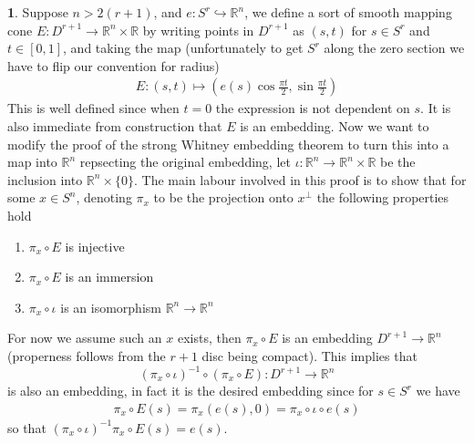 \documentclass[10.5pt]{article}
\theoremstyle{definition}
\newtheorem{pb}{}
\newcommand{\set}[1]{\{#1\}}
\begin{document}
    \begin{pb}
        Suppose \(n > 2(r+1)\), and \(e: S^r \hookrightarrow \mathbb{R}^n\), we define a sort of smooth mapping cone \(E: D^{r+1} \to \mathbb{R}^n \times \mathbb{R}\) by writing points in \(D^{r+1}\) as \((s,t)\) for \(s \in S^r\) and \(t \in [0,1]\), and taking the map (unfortunately to get \(S^r\) along the zero section we have to flip our convention for radius)
        \begin{align*}
            E:(s,t) \mapsto \left(e(s)\cos\frac{\pi t}{2},\sin\frac{\pi t}{2}\right)
        \end{align*}
        This is well defined since when \(t = 0\) the expression is not dependent on \(s\). It is also immediate from construction that \(E\) is an embedding. Now we want to modify the proof of the strong Whitney embedding theorem to turn this into a map into \(\mathbb{R}^n\) repsecting the original embedding, let \(\iota: \mathbb{R}^n \to \mathbb{R}^n\times \mathbb{R}\) be the inclusion into \(\mathbb{R}^n \times \set{0}\). The main labour involved in this proof is to show that for some \(x \in S^n\), denoting \(\pi_x\) to be the projection onto \(x^\perp\) the following properties hold
        \begin{enumerate}
            \item \(\pi_x \circ E\) is injective
            \item \(\pi_x \circ E\) is an immersion
            \item \(\pi_x \circ \iota\) is an isomorphism \(\mathbb{R}^n \to \mathbb{R}^n\)
        \end{enumerate}
        For now we assume such an \(x\) exists, then \(\pi_x \circ E\) is an embedding \(D^{r+1} \to \mathbb{R}^n\) (properness follows from the \(r+1\) disc being compact). This implies that \[(\pi_x \circ \iota)^{-1}\circ(\pi_x\circ E): D^{r+1} \to \mathbb{R}^n\] is also an embedding, in fact it is the desired embedding since for \(s \in S^r\) we have
        \begin{align*}
            \pi_x\circ E(s) = \pi_x(e(s),0) = \pi_x\circ\iota\circ e(s)
        \end{align*}
        so that \((\pi_x\circ \iota)^{-1}\pi_x\circ E(s) = e(s)\).


\end{pb}
\end{document}
